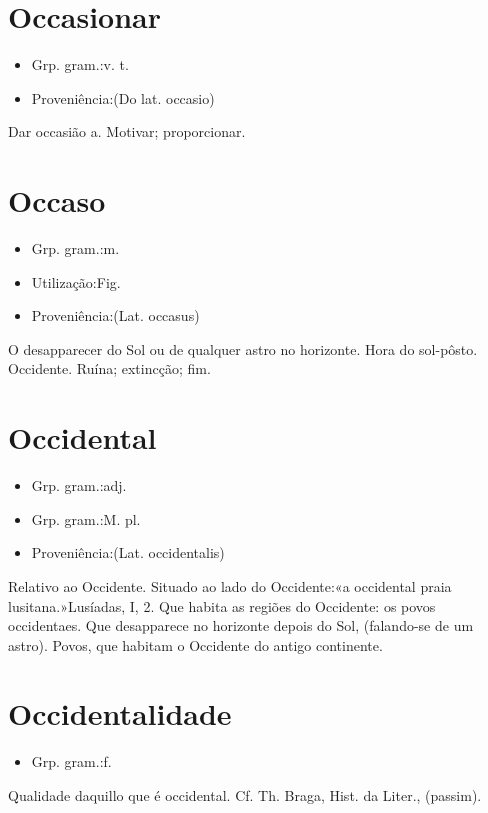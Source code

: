 \section{Occasionar}
\begin{itemize}
\item {Grp. gram.:v. t.}
\end{itemize}
\begin{itemize}
\item {Proveniência:(Do lat. \textunderscore occasio\textunderscore )}
\end{itemize}
Dar occasião a.
Motivar; proporcionar.
\section{Occaso}
\begin{itemize}
\item {Grp. gram.:m.}
\end{itemize}
\begin{itemize}
\item {Utilização:Fig.}
\end{itemize}
\begin{itemize}
\item {Proveniência:(Lat. \textunderscore occasus\textunderscore )}
\end{itemize}
O desapparecer do Sol ou de qualquer astro no horizonte.
Hora do sol-pôsto.
Occidente.
Ruína; extincção; fim.
\section{Occidental}
\begin{itemize}
\item {Grp. gram.:adj.}
\end{itemize}
\begin{itemize}
\item {Grp. gram.:M. pl.}
\end{itemize}
\begin{itemize}
\item {Proveniência:(Lat. \textunderscore occidentalis\textunderscore )}
\end{itemize}
Relativo ao Occidente.
Situado ao lado do Occidente:«\textunderscore a occidental praia lusitana.\textunderscore »\textunderscore Lusíadas\textunderscore , I, 2.
Que habita as regiões do Occidente: \textunderscore os povos occidentaes\textunderscore .
Que desapparece no horizonte depois do Sol, (falando-se de um astro).
Povos, que habitam o Occidente do antigo continente.
\section{Occidentalidade}
\begin{itemize}
\item {Grp. gram.:f.}
\end{itemize}
Qualidade daquillo que é occidental. Cf. Th. Braga, \textunderscore Hist. da Liter.\textunderscore , (passim).
